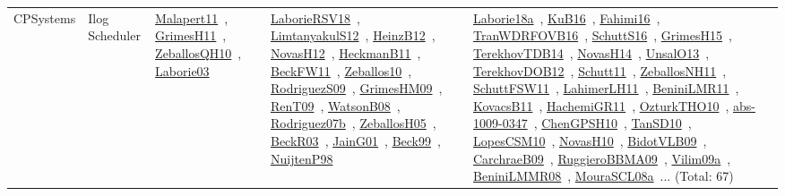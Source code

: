 {\begin{longtable}{lp{3cm}>{\raggedright\arraybackslash}p{6cm}>{\raggedright\arraybackslash}p{6cm}>{\raggedright\arraybackslash}p{8cm}}
CPSystems & Ilog Scheduler & \href{../works/Malapert11.pdf}{Malapert11}~\cite{Malapert11}, \href{../works/GrimesH11.pdf}{GrimesH11}~\cite{GrimesH11}, \href{../works/ZeballosQH10.pdf}{ZeballosQH10}~\cite{ZeballosQH10}, \href{../works/Laborie03.pdf}{Laborie03}~\cite{Laborie03} & \href{../works/LaborieRSV18.pdf}{LaborieRSV18}~\cite{LaborieRSV18}, \href{../works/LimtanyakulS12.pdf}{LimtanyakulS12}~\cite{LimtanyakulS12}, \href{../works/HeinzB12.pdf}{HeinzB12}~\cite{HeinzB12}, \href{../works/NovasH12.pdf}{NovasH12}~\cite{NovasH12}, \href{../works/HeckmanB11.pdf}{HeckmanB11}~\cite{HeckmanB11}, \href{../works/BeckFW11.pdf}{BeckFW11}~\cite{BeckFW11}, \href{../works/Zeballos10.pdf}{Zeballos10}~\cite{Zeballos10}, \href{../works/RodriguezS09.pdf}{RodriguezS09}~\cite{RodriguezS09}, \href{../works/GrimesHM09.pdf}{GrimesHM09}~\cite{GrimesHM09}, \href{../works/RenT09.pdf}{RenT09}~\cite{RenT09}, \href{../works/WatsonB08.pdf}{WatsonB08}~\cite{WatsonB08}, \href{../works/Rodriguez07b.pdf}{Rodriguez07b}~\cite{Rodriguez07b}, \href{../works/ZeballosH05.pdf}{ZeballosH05}~\cite{ZeballosH05}, \href{../works/BeckR03.pdf}{BeckR03}~\cite{BeckR03}, \href{../works/JainG01.pdf}{JainG01}~\cite{JainG01}, \href{../works/Beck99.pdf}{Beck99}~\cite{Beck99}, \href{../works/NuijtenP98.pdf}{NuijtenP98}~\cite{NuijtenP98} & \href{../works/Laborie18a.pdf}{Laborie18a}~\cite{Laborie18a}, \href{../works/KuB16.pdf}{KuB16}~\cite{KuB16}, \href{../works/Fahimi16.pdf}{Fahimi16}~\cite{Fahimi16}, \href{../works/TranWDRFOVB16.pdf}{TranWDRFOVB16}~\cite{TranWDRFOVB16}, \href{../works/SchuttS16.pdf}{SchuttS16}~\cite{SchuttS16}, \href{../works/GrimesH15.pdf}{GrimesH15}~\cite{GrimesH15}, \href{../works/TerekhovTDB14.pdf}{TerekhovTDB14}~\cite{TerekhovTDB14}, \href{../works/NovasH14.pdf}{NovasH14}~\cite{NovasH14}, \href{../works/UnsalO13.pdf}{UnsalO13}~\cite{UnsalO13}, \href{../works/TerekhovDOB12.pdf}{TerekhovDOB12}~\cite{TerekhovDOB12}, \href{../works/Schutt11.pdf}{Schutt11}~\cite{Schutt11}, \href{../works/ZeballosNH11.pdf}{ZeballosNH11}~\cite{ZeballosNH11}, \href{../works/SchuttFSW11.pdf}{SchuttFSW11}~\cite{SchuttFSW11}, \href{../works/LahimerLH11.pdf}{LahimerLH11}~\cite{LahimerLH11}, \href{../works/BeniniLMR11.pdf}{BeniniLMR11}~\cite{BeniniLMR11}, \href{../works/KovacsB11.pdf}{KovacsB11}~\cite{KovacsB11}, \href{../works/HachemiGR11.pdf}{HachemiGR11}~\cite{HachemiGR11}, \href{../works/OzturkTHO10.pdf}{OzturkTHO10}~\cite{OzturkTHO10}, \href{../works/abs-1009-0347.pdf}{abs-1009-0347}~\cite{abs-1009-0347}, \href{../works/ChenGPSH10.pdf}{ChenGPSH10}~\cite{ChenGPSH10}, \href{../works/TanSD10.pdf}{TanSD10}~\cite{TanSD10}, \href{../works/LopesCSM10.pdf}{LopesCSM10}~\cite{LopesCSM10}, \href{../works/NovasH10.pdf}{NovasH10}~\cite{NovasH10}, \href{../works/BidotVLB09.pdf}{BidotVLB09}~\cite{BidotVLB09}, \href{../works/CarchraeB09.pdf}{CarchraeB09}~\cite{CarchraeB09}, \href{../works/RuggieroBBMA09.pdf}{RuggieroBBMA09}~\cite{RuggieroBBMA09}, \href{../works/Vilim09a.pdf}{Vilim09a}~\cite{Vilim09a}, \href{../works/BeniniLMMR08.pdf}{BeniniLMMR08}~\cite{BeniniLMMR08}, \href{../works/MouraSCL08a.pdf}{MouraSCL08a}~\cite{MouraSCL08a}... (Total: 67)\\

\end{longtable}}
